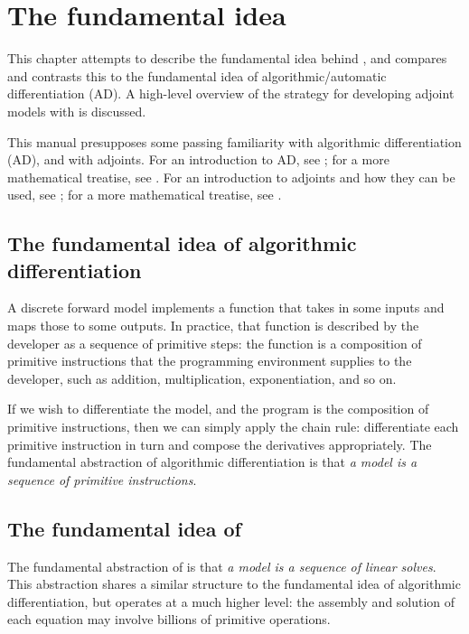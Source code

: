 \chapter{The fundamental idea}

\begin{synopsis}
This chapter attempts to describe the fundamental idea behind \libadjoint, 
and compares and contrasts this to the fundamental idea of algorithmic/automatic differentiation (AD).
A high-level overview of the strategy for developing adjoint models with \libadjoint is discussed.
\end{synopsis}
\minitoc
\vspace{\fill}

This manual presupposes some passing familiarity with algorithmic differentiation (AD),
and with adjoints. For an introduction to AD, see \citet{rall1996}; for a more mathematical
treatise, see \citet{griewank2003,griewank2008}. For an introduction to adjoints and how
they can be used, see \citet{gunzburger2003,giles2000,errico1997}; for a more mathematical
treatise, see \citet{hinze2009}.

\newpage

\section{The fundamental idea of algorithmic differentiation}
A discrete forward model implements a function that takes in some inputs
and maps those to some outputs. In practice, that function is described
by the developer as a sequence of primitive steps: the function is
a composition of primitive instructions that the programming environment
supplies to the developer, such as addition, multiplication, exponentiation,
and so on.

If we wish to differentiate the model, and the program is the composition
of primitive instructions, then we can simply apply the chain rule:
differentiate each primitive instruction in turn and compose the derivatives
appropriately. The fundamental abstraction of algorithmic differentiation
is that \emph{a model is a sequence of primitive instructions}.

\section{The fundamental idea of \libadjoint}
The fundamental abstraction of \libadjoint is that \emph{a model is a sequence
of linear solves}. This abstraction shares a similar structure to the fundamental
idea of algorithmic differentiation, but operates at a much higher level:
the assembly and solution of each equation may involve billions of primitive operations.

